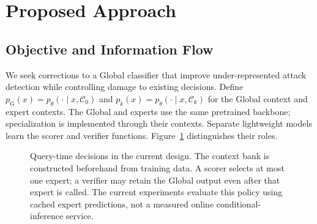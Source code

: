 \documentclass[sigconf,anonymous,pbalance]{acmart}
\newcommand{\globalidx}{\mathrm{G}}
\newcommand{\ctx}{\mathcal{C}}
\begin{document}
\section{Proposed Approach}
\label{sec:approach}
\subsection{Objective and Information Flow}
We seek corrections to a Global classifier that improve under-represented attack detection while controlling damage to existing decisions. Define $p_{\globalidx}(x)=p_{\theta}(\cdot\mid x,\ctx_0)$ and $p_k(x)=p_{\theta}(\cdot\mid x,\ctx_k)$ for the Global context and expert contexts. The Global and experts use the same pretrained backbone; specialization is implemented through their contexts. Separate lightweight models learn the scorer and verifier functions. Figure~\ref{fig:architecture} distinguishes their roles.

\begin{figure}[t]
\centering
{}
\caption{Query-time decisions in the current design. The context bank is constructed beforehand from training data. A scorer selects at most one expert; a verifier may retain the Global output even after that expert is called. The current experiments evaluate this policy using cached expert predictions, not a measured online conditional-inference service.}
\label{fig:architecture}
\end{figure}
\end{document}
